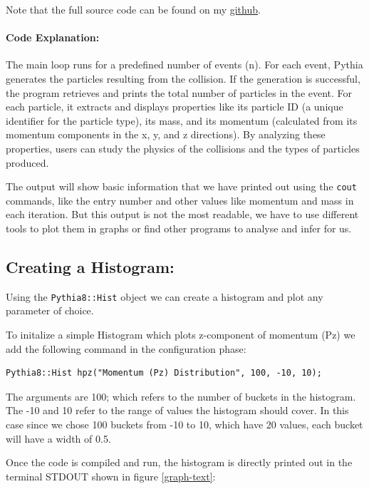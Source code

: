 \documentclass[letterpaper,12pt]{article}
\begin{document}
\begin{spacing}{1.125}
Note that the full source code can be found on my
\href{https://github.com/abhiramtilakiiit/research/blob/main/simulations/introduction/proton_collision.cc}{github}.

\paragraph{Code Explanation:}
The main loop runs for a predefined number of events (n). For each event, Pythia
generates the particles resulting from the collision. If the generation is
successful, the program retrieves and prints the total number of particles in
the event. For each particle, it extracts and displays properties like its
particle ID (a unique identifier for the particle type), its mass, and its
momentum (calculated from its momentum components in the x, y, and z
directions). By analyzing these properties, users can study the physics of the
collisions and the types of particles produced.

The output will show basic information that we have printed out using the
\texttt{cout} commands, like the entry number and other values like momentum and
mass in each iteration. But this output is not the most readable, we have to
use different tools to plot them in graphs or find other programs to analyse and
infer for us.

\subsection{Creating a Histogram:}

Using the \texttt{Pythia8::Hist} object we can create a histogram and plot any
parameter of choice.

To initalize a simple Histogram which plots z-component of momentum (Pz) we add the following command
in the configuration phase:

\begin{lstlisting}[style=python, caption={Initializing Histogram object in Pythia}]
    Pythia8::Hist hpz("Momentum (Pz) Distribution", 100, -10, 10);
\end{lstlisting}

The arguments are 100; which refers to the number of buckets in the histogram.
The -10 and 10 refer to the range of values the histogram should cover. In this
case since we chose 100 buckets from -10 to 10, which have 20 values, each
bucket will have a width of 0.5.

Once the code is compiled and run, the histogram is directly printed out in the
terminal STDOUT shown in figure \ref{graph-text}:


\end{spacing}
\end{document}
